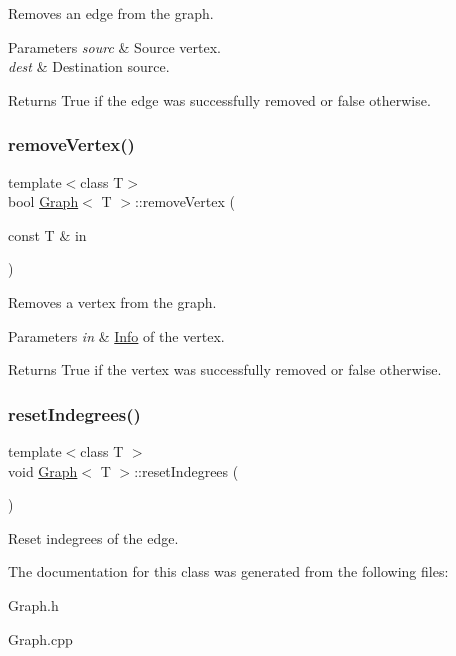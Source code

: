 Removes an edge from the graph. 
\begin{DoxyParams}{Parameters}
{\em sourc} & Source vertex. \\
\hline
{\em dest} & Destination source. \\
\hline
\end{DoxyParams}
\begin{DoxyReturn}{Returns}
True if the edge was successfully removed or false otherwise. 
\end{DoxyReturn}
\mbox{\label{class_graph_af9c903104ad69a7782979fa9caedf163}} 
\subsubsection{\texorpdfstring{remove\+Vertex()}{removeVertex()}}
{\footnotesize\ttfamily template$<$class T$>$ \\
bool \hyperlink{class_graph}{Graph}$<$ T $>$\+::remove\+Vertex (\begin{DoxyParamCaption}\item[{const T \&}]{in }\end{DoxyParamCaption})}

Removes a vertex from the graph. 
\begin{DoxyParams}{Parameters}
{\em in} & \hyperlink{class_info}{Info} of the vertex. \\
\hline
\end{DoxyParams}
\begin{DoxyReturn}{Returns}
True if the vertex was successfully removed or false otherwise. 
\end{DoxyReturn}
\mbox{\label{class_graph_af34eb86d804272e6e3e221a9ed688c53}} 
\subsubsection{\texorpdfstring{reset\+Indegrees()}{resetIndegrees()}}
{\footnotesize\ttfamily template$<$class T $>$ \\
void \hyperlink{class_graph}{Graph}$<$ T $>$\+::reset\+Indegrees (\begin{DoxyParamCaption}{ }\end{DoxyParamCaption})}

Reset indegrees of the edge. 

The documentation for this class was generated from the following files\+:\begin{DoxyCompactItemize}
\item 
Graph.\+h\item 
Graph.\+cpp\end{DoxyCompactItemize}
